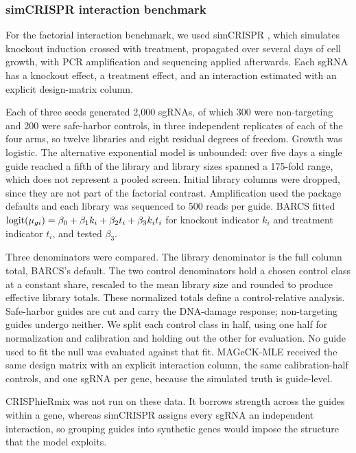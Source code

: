 \subsubsection{simCRISPR interaction benchmark}

For the factorial interaction benchmark, we used simCRISPR
\citep{zhu2026simcrispr}, which simulates knockout induction crossed with
treatment, propagated over several days of cell growth, with PCR amplification
and sequencing applied afterwards.  Each sgRNA has a knockout effect, a
treatment effect, and an interaction estimated with an explicit design-matrix
column.

Each of three seeds generated 2,000 sgRNAs, of which 300 were non-targeting
and 200 were safe-harbor controls, in three independent replicates of each of
the four arms, so twelve libraries and eight residual degrees of freedom.
Growth was logistic.  The alternative exponential model is unbounded: over
five days a single guide reached a fifth of the library and library sizes
spanned a 175-fold range, which does not represent a pooled screen.  Initial
library columns were dropped, since they are not part of the factorial
contrast.  Amplification used the package defaults and each library was
sequenced to 500 reads per guide.  BARCS fitted
$\operatorname{logit}(\mu_{gi})=\beta_0+\beta_1 k_i+\beta_2 t_i+\beta_3 k_i t_i$ for
knockout indicator $k_i$ and treatment indicator $t_i$, and tested $\beta_3$.

Three denominators were compared.  The library denominator is the full column
total, BARCS's default.  The two control denominators hold a chosen control
class at a constant share, rescaled to the mean library size and rounded to
produce effective library totals.  These normalized totals define a
control-relative analysis.  Safe-harbor guides are cut and carry the
DNA-damage response; non-targeting guides undergo neither.  We split each
control class in half, using one half for normalization and calibration and
holding out the other for evaluation.  No guide used to fit the null was
evaluated against that fit.  MAGeCK-MLE received the same design matrix with
an explicit interaction column, the same calibration-half controls, and one
sgRNA per gene, because the simulated truth is guide-level.

CRISPhieRmix was not run on these data.  It borrows strength across the guides
within a gene, whereas simCRISPR assigns every sgRNA an independent
interaction, so grouping guides into synthetic genes would impose the
structure that the model exploits.

